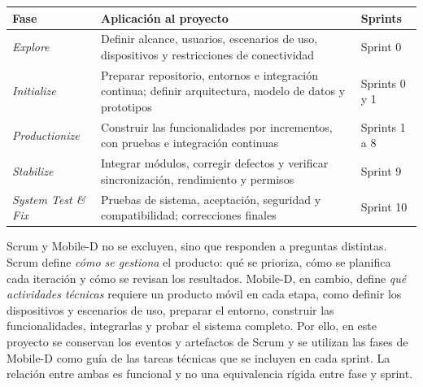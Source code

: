 {\centering\singlespacing
  \label{tab:fases_mobiled}
  \begin{tabular}{|p{}|p{}|p{}|}
    \hline
    \textbf{Fase} & \textbf{Aplicación al proyecto} & \textbf{Sprints} \tabularnewline
    \hline
    \raggedright\hspace{0pt}\textit{Explore} & \raggedright\hspace{0pt}Definir alcance, usuarios, escenarios de uso, dispositivos y restricciones de conectividad & \raggedright\hspace{0pt}Sprint 0 \tabularnewline
    \hline
    \raggedright\hspace{0pt}\textit{Initialize} & \raggedright\hspace{0pt}Preparar repositorio, entornos e integración continua; definir arquitectura, modelo de datos y prototipos & \raggedright\hspace{0pt}Sprints 0 y 1 \tabularnewline
    \hline
    \raggedright\hspace{0pt}\textit{Productionize} & \raggedright\hspace{0pt}Construir las funcionalidades por incrementos, con pruebas e integración continuas & \raggedright\hspace{0pt}Sprints 1 a 8 \tabularnewline
    \hline
    \raggedright\hspace{0pt}\textit{Stabilize} & \raggedright\hspace{0pt}Integrar módulos, corregir defectos y verificar sincronización, rendimiento y permisos & \raggedright\hspace{0pt}Sprint 9 \tabularnewline
    \hline
    \raggedright\hspace{0pt}\textit{System Test \& Fix} & \raggedright\hspace{0pt}Pruebas de sistema, aceptación, seguridad y compatibilidad; correcciones finales & \raggedright\hspace{0pt}Sprint 10 \tabularnewline
    \hline
  \end{tabular}\par}

Scrum y Mobile-D no se excluyen, sino que responden a preguntas distintas. Scrum define \textit{cómo se gestiona} el producto: qué se prioriza, cómo se planifica cada iteración y cómo se revisan los resultados. Mobile-D, en cambio, define \textit{qué actividades técnicas} requiere un producto móvil en cada etapa, como definir los dispositivos y escenarios de uso, preparar el entorno, construir las funcionalidades, integrarlas y probar el sistema completo. Por ello, en este proyecto se conservan los eventos y artefactos de Scrum y se utilizan las fases de Mobile-D como guía de las tareas técnicas que se incluyen en cada sprint. La relación entre ambas es funcional y no una equivalencia rígida entre fase y sprint.

